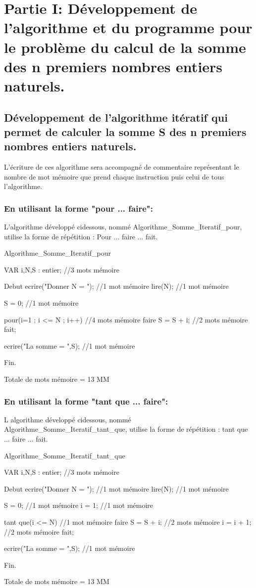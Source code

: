 \documentclass[•]{article}
\begin{document}
\def\reportnumber{1}
\def\reporttitle{Mesure du temps d'exécution d'un programme.}


\section{Partie I: Développement de l'algorithme et du programme pour le problème du calcul de la somme des n premiers nombres entiers naturels.}

\subsection{Développement de l'algorithme itératif qui permet de calculer la somme S des n premiers nombres entiers naturels.}
\textrm{L'écriture de ces algorithme sera accompagné de commentaire représentant le nombre de mot mémoire que prend chaque instruction puis celui de tous l'algorithme.}  

\subsubsection{En utilisant la forme "pour ... faire":}
\textrm{L'algorithme développé ci\-dessous, nommé Algorithme\_Somme\_Iteratif\_pour, utilise la forme de répétition : Pour ... faire ... fait.}
\begin{sql}

 Algorithme_Somme_Iteratif_pour
 
 VAR
 i,N,S : entier;				//3 mots mémoire
 
 Debut
	ecrire("Donner N = ");		//1 mot mémoire
	lire(N);					//1 mot mémoire
	
	S = 0;						//1 mot mémoire
	
	pour(i=1 ; i <= N ; i++)	//4 mots mémoire
	  faire
		S = S + i;				//2 mots mémoire
	  fait;
	  
	ecrire("La somme = ",S);	//1 mot mémoire
	
 Fin.
\end{sql}
\textrm{Totale de mots mémoire = 13 MM}

\subsubsection{En utilisant la forme "tant que ... faire":}
\textrm{L algorithme développé ci\-dessous, nommé Algorithme\_Somme\_Iteratif\_tant\_que, utilise la forme de répétition : tant que ... faire ... fait.}
\begin{sql}

 Algorithme_Somme_Iteratif_tant_que
 
 VAR
 i,N,S : entier;				//3 mots mémoire
 
 Debut
	ecrire("Donner N = ");		//1 mot mémoire
	lire(N);					//1 mot mémoire
	
	S = 0;						//1 mot mémoire
	i = 1;						//1 mot mémoire
	
	tant que(i <= N)			//1 mot mémoire
	  faire
		S = S + i;				//2 mots mémoire
		i = i + 1;				//2 mots mémoire
	  fait;
	  
	ecrire("La somme = ",S);	//1 mot mémoire
	
 Fin.
\end{sql}
\textrm{Totale de mots mémoire = 13 MM}
\end{document}
